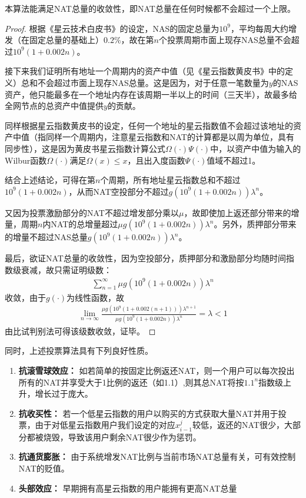 \begin{property}
本算法能满足NAT总量的收敛性，即NAT总量在任何时候都不会超过一个上限。
\end{property}
\begin{proof}
	根据《星云技术白皮书》的设定，NAS的固定总量为$10^9$，平均每周大约增发（在固定总量的基础上）$0.2\%$，故在第$n$个投票周期市面上现存NAS总量不会超过$10^9(1+0.002n)$。
	
	接下来我们证明所有地址一个周期内的资产中值（见《星云指数黄皮书》中的定义）总和不会超过市面上现存NAS总量。这是因为，对于任意一笔数量为$y$的NAS资产，他只能最多在一个地址内存在该周期一半以上的时间（三天半），故最多给全网节点的总资产中值提供$y$的贡献。
	
	同样根据星云指数黄皮书的设定，任何一个地址的星云指数值不会超过该地址的资产中值（指同样一个周期内，注意星云指数和NAT的计算都是以周为单位，具有同步性），这是因为黄皮书星云指数计算公式$\Omega(\cdot)\Psi(\cdot)$中，以资产中值为输入的Wilbur函数$\Omega(\cdot)$满足$\Omega(x)\leq x$，且出入度函数$\Psi(\cdot)$值域不超过1。
	
	结合上述结论，可得在第$n$个周期，所有地址星云指数总和不超过$10^9(1+0.002n)$，从而NAT空投部分不超过$g(10^9(1+0.002n))\lambda^n$。
	
	又因为投票激励部分的NAT不超过增发部分乘以$\mu$，故即使加上返还部分带来的增量，周期$n$内NAT的总增量超过$\mu g(10^9(1+0.002n))\lambda^n$。另外，质押部分带来的增量不超过NAS总量$g(10^9(1+0.002n))\lambda^n$。
	
	最后，欲证NAT总量的收敛性，因为空投部分，质押部分和激励部分均随时间指数级衰减，故只需证明级数：
	\begin{align}
	\sum_{n=1}^{\infty} \mu g(10^9(1+0.002n))\lambda^n
	\end{align}
	收敛，由于$g(\cdot)$为线性函数，故
	\begin{align}
	\lim_{n\rightarrow \infty} \frac{\mu g(10^9(1+0.002(n+1)))\lambda^{n+1}}{\mu g(10^9(1+0.002n))\lambda^n} = \lambda <1
	\end{align}
	由比试判别法可得该级数收敛，证毕。
\end{proof}
同时，上述投票算法具有下列良好性质。
\begin{enumerate}
	\item \textbf{抗滚雪球效应：} 如若简单的按固定比例返还NAT，则一个用户可以每次投出所有的NAT并享受大于1比例的返还（如1.1）,则其总NAT将按$1.1^n$指数级上升，增长过于庞大。
	\item \textbf{抗收买性：} 若一个低星云指数的用户以购买的方式获取大量NAT并用于投票，由于对低星云指数用户我们设定的对应$x_{i-1}^j$较低，返还的NAT很少，大部分都被烧毁，导致该用户剩余NAT很少作为惩罚。
	\item \textbf{抗通货膨胀：} 由于系统增发NAT比例与当前市场NAT总量有关，可有效控制NAT的贬值。
	\item \textbf{头部效应：} 早期拥有高星云指数的用户能拥有更高NAT总量
\end{enumerate}